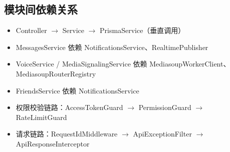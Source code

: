 \subsection{模块间依赖关系}
\begin{itemize}[itemsep=0pt]
  \item Controller $\to$ Service $\to$ PrismaService（垂直调用）
  \item MessagesService 依赖 NotificationsService、RealtimePublisher
  \item VoiceService / MediaSignalingService 依赖 MediasoupWorkerClient、MediasoupRouterRegistry
  \item FriendsService 依赖 NotificationsService
  \item 权限校验链路：AccessTokenGuard $\to$ PermissionGuard $\to$ RateLimitGuard
  \item 请求链路：RequestIdMiddleware $\to$ ApiExceptionFilter $\to$ ApiResponseInterceptor
\end{itemize}
